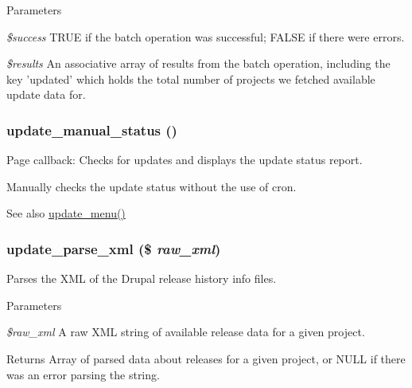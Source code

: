 \begin{DoxyParams}{Parameters}
\item[{\em \$success}]TRUE if the batch operation was successful; FALSE if there were errors. \item[{\em \$results}]An associative array of results from the batch operation, including the key 'updated' which holds the total number of projects we fetched available update data for. \end{DoxyParams}
\hypertarget{update_8fetch_8inc_acb92114e3c9f719e50f66ac62ff78e01}{
\subsubsection[{update\_\-manual\_\-status}]{\setlength{\rightskip}{0pt plus 5cm}update\_\-manual\_\-status ()}}
\label{update_8fetch_8inc_acb92114e3c9f719e50f66ac62ff78e01}
Page callback: Checks for updates and displays the update status report.

Manually checks the update status without the use of cron.

\begin{DoxySeeAlso}{See also}
\hyperlink{update_8module_abfea1a759334c0461fa9ff2250bdfaaf}{update\_\-menu()} 
\end{DoxySeeAlso}
\hypertarget{update_8fetch_8inc_a3d8f5a924c1de0728c829d3c92d60d19}{
\subsubsection[{update\_\-parse\_\-xml}]{\setlength{\rightskip}{0pt plus 5cm}update\_\-parse\_\-xml (\$ {\em raw\_\-xml})}}
\label{update_8fetch_8inc_a3d8f5a924c1de0728c829d3c92d60d19}
Parses the XML of the Drupal release history info files.


\begin{DoxyParams}{Parameters}
\item[{\em \$raw\_\-xml}]A raw XML string of available release data for a given project.\end{DoxyParams}
\begin{DoxyReturn}{Returns}
Array of parsed data about releases for a given project, or NULL if there was an error parsing the string. 
\end{DoxyReturn}

